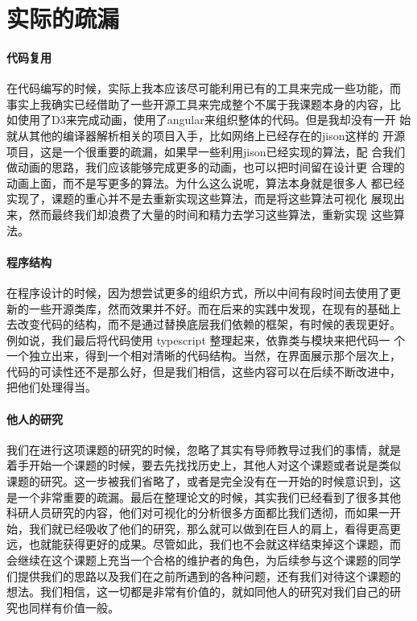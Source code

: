 \documentclass{article}
\begin{document}
\section{实际的疏漏}
\paragraph{代码复用}
在代码编写的时候，实际上我本应该尽可能利用已有的工具来完成一些功能，而
事实上我确实已经借助了一些开源工具来完成整个不属于我课题本身的内容，比
如使用了D3来完成动画，使用了angular来组织整体的代码。但是我却没有一开
始就从其他的编译器解析相关的项目入手，比如网络上已经存在的jison这样的
开源项目，这是一个很重要的疏漏，如果早一些利用jison已经实现的算法，配
合我们做动画的思路，我们应该能够完成更多的动画，也可以把时间留在设计更
合理的动画上面，而不是写更多的算法。为什么这么说呢，算法本身就是很多人
都已经实现了，课题的重心并不是去重新实现这些算法，而是将这些算法可视化
展现出来，然而最终我们却浪费了大量的时间和精力去学习这些算法，重新实现
这些算法。
\paragraph{程序结构}
在程序设计的时候，因为想尝试更多的组织方式，所以中间有段时间去使用了更
新的一些开源类库，然而效果并不好。而在后来的实践中发现，在现有的基础上
去改变代码的结构，而不是通过替换底层我们依赖的框架，有时候的表现更好。
例如说，我们最后将代码使用 typescript 整理起来，依靠类与模块来把代码一
个一个独立出来，得到一个相对清晰的代码结构。当然，在界面展示那个层次上，
代码的可读性还不是那么好，但是我们相信，这些内容可以在后续不断改进中，
把他们处理得当。
\paragraph{他人的研究}
我们在进行这项课题的研究的时候，忽略了其实有导师教导过我们的事情，就是
着手开始一个课题的时候，要去先找找历史上，其他人对这个课题或者说是类似
课题的研究。这一步被我们省略了，或者是完全没有在一开始的时候意识到，这
是一个非常重要的疏漏。最后在整理论文的时候，其实我们已经看到了很多其他
科研人员研究的内容，他们对可视化的分析很多方面都比我们透彻，而如果一开
始，我们就已经吸收了他们的研究，那么就可以做到在巨人的肩上，看得更高更
远，也就能获得更好的成果。尽管如此，我们也不会就这样结束掉这个课题，而
会继续在这个课题上充当一个合格的维护者的角色，为后续参与这个课题的同学
们提供我们的思路以及我们在之前所遇到的各种问题，还有我们对待这个课题的
想法。我们相信，这一切都是非常有价值的，就如同他人的研究对我们自己的研
究也同样有价值一般。
\end{document}

